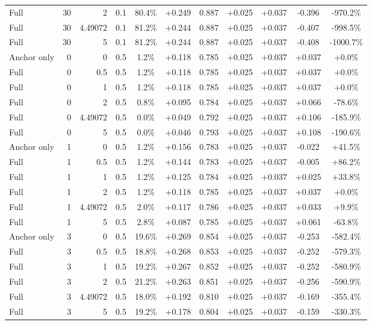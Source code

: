 \begin{table}[htbp]
\begin{tabular}{lrrrccccccc}
Full & 30 & 2 & 0.1 & 80.4\% & +0.249 & 0.887 & +0.025 & +0.037 & -0.396 & -970.2\% \\
Full & 30 & 4.49072 & 0.1 & 81.2\% & +0.244 & 0.887 & +0.025 & +0.037 & -0.407 & -998.5\% \\
Full & 30 & 5 & 0.1 & 81.2\% & +0.244 & 0.887 & +0.025 & +0.037 & -0.408 & -1000.7\% \\
Anchor only & 0 & 0 & 0.5 & 1.2\% & +0.118 & 0.785 & +0.025 & +0.037 & +0.037 & +0.0\% \\
Full & 0 & 0.5 & 0.5 & 1.2\% & +0.118 & 0.785 & +0.025 & +0.037 & +0.037 & +0.0\% \\
Full & 0 & 1 & 0.5 & 1.2\% & +0.118 & 0.785 & +0.025 & +0.037 & +0.037 & +0.0\% \\
Full & 0 & 2 & 0.5 & 0.8\% & +0.095 & 0.784 & +0.025 & +0.037 & +0.066 & -78.6\% \\
Full & 0 & 4.49072 & 0.5 & 0.0\% & +0.049 & 0.792 & +0.025 & +0.037 & +0.106 & -185.9\% \\
Full & 0 & 5 & 0.5 & 0.0\% & +0.046 & 0.793 & +0.025 & +0.037 & +0.108 & -190.6\% \\
Anchor only & 1 & 0 & 0.5 & 1.2\% & +0.156 & 0.783 & +0.025 & +0.037 & -0.022 & +41.5\% \\
Full & 1 & 0.5 & 0.5 & 1.2\% & +0.144 & 0.783 & +0.025 & +0.037 & -0.005 & +86.2\% \\
Full & 1 & 1 & 0.5 & 1.2\% & +0.125 & 0.784 & +0.025 & +0.037 & +0.025 & +33.8\% \\
Full & 1 & 2 & 0.5 & 1.2\% & +0.118 & 0.785 & +0.025 & +0.037 & +0.037 & +0.0\% \\
Full & 1 & 4.49072 & 0.5 & 2.0\% & +0.117 & 0.786 & +0.025 & +0.037 & +0.033 & +9.9\% \\
Full & 1 & 5 & 0.5 & 2.8\% & +0.087 & 0.785 & +0.025 & +0.037 & +0.061 & -63.8\% \\
Anchor only & 3 & 0 & 0.5 & 19.6\% & +0.269 & 0.854 & +0.025 & +0.037 & -0.253 & -582.4\% \\
Full & 3 & 0.5 & 0.5 & 18.8\% & +0.268 & 0.853 & +0.025 & +0.037 & -0.252 & -579.3\% \\
Full & 3 & 1 & 0.5 & 19.2\% & +0.267 & 0.852 & +0.025 & +0.037 & -0.252 & -580.9\% \\
Full & 3 & 2 & 0.5 & 21.2\% & +0.263 & 0.851 & +0.025 & +0.037 & -0.256 & -590.9\% \\
Full & 3 & 4.49072 & 0.5 & 18.0\% & +0.192 & 0.810 & +0.025 & +0.037 & -0.169 & -355.4\% \\
Full & 3 & 5 & 0.5 & 19.2\% & +0.178 & 0.804 & +0.025 & +0.037 & -0.159 & -330.3\% \\

\end{tabular}
\end{table}
